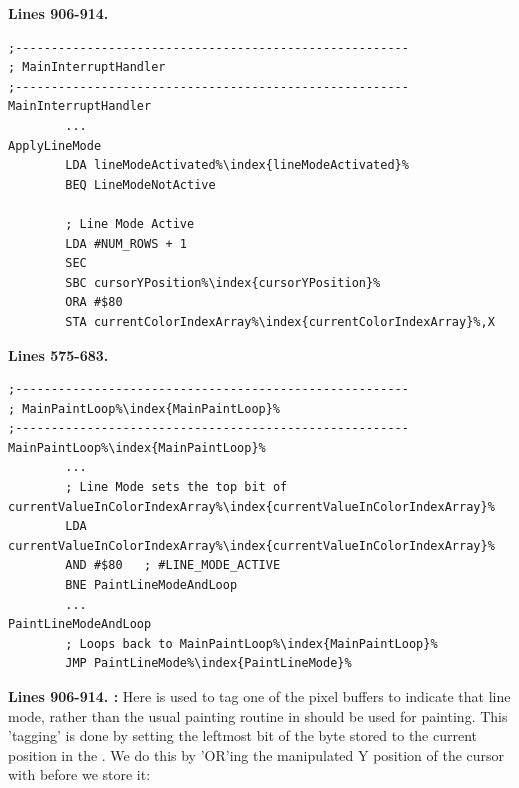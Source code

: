 \textbf{Lines 906-914. } 
\begin{lstlisting}[caption=From \icode{MainInterruptHandler}.,escapechar=\%]
;-------------------------------------------------------
; MainInterruptHandler
;-------------------------------------------------------
MainInterruptHandler
        ...
ApplyLineMode
        LDA lineModeActivated%\index{lineModeActivated}%
        BEQ LineModeNotActive

        ; Line Mode Active
        LDA #NUM_ROWS + 1
        SEC 
        SBC cursorYPosition%\index{cursorYPosition}%
        ORA #$80
        STA currentColorIndexArray%\index{currentColorIndexArray}%,X
\end{lstlisting}

\textbf{Lines 575-683. } 
\begin{lstlisting}[caption=From \icode{MainPaintLoop\index{MainPaintLoop}}.,escapechar=\%]
;-------------------------------------------------------
; MainPaintLoop%\index{MainPaintLoop}%
;-------------------------------------------------------
MainPaintLoop%\index{MainPaintLoop}%    
        ...
        ; Line Mode sets the top bit of currentValueInColorIndexArray%\index{currentValueInColorIndexArray}%
        LDA currentValueInColorIndexArray%\index{currentValueInColorIndexArray}%
        AND #$80   ; #LINE_MODE_ACTIVE
        BNE PaintLineModeAndLoop
        ...
PaintLineModeAndLoop
        ; Loops back to MainPaintLoop%\index{MainPaintLoop}%
        JMP PaintLineMode%\index{PaintLineMode}%
\end{lstlisting}
\clearpage
{}
\textbf{Lines 906-914. :} Here  is used
to tag one of the pixel buffers to indicate that line mode, rather than the usual painting routine
in  should be used for painting. This 'tagging'
is done by setting the leftmost bit of the byte stored to the current position in the 
. We do this by 'OR'ing the manipulated Y position of the cursor
with  before we store it:

